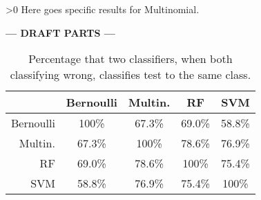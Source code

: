 \ifnum\printdraft>0
	Here goes specific results for Multinomial.
\else
\begin{center}
  	\textbf{--- DRAFT PARTS ---}
\end{center}
\fi

\begin{table}[h]\footnotesize
	\caption{Percentage that two classifiers, when both classifying wrong, classifies test to the same class.}
	\begin{tabular}{r|cccc}
	\ 		 	& Bernoulli & Multin. 	&RF 		&SVM \\ \hline
	Bernoulli 	&100\%   	&67.3\%   	&69.0\%   	&58.8\%\\
	Multin. 	&67.3\%  	&100\%   	&78.6\%   	&76.9\%\\
	RF 			&69.0\%   	&78.6\%  	&100\%   	&75.4\%\\
	SVM 		&58.8\%   	&76.9\%   	&75.4\%  	&100\%
	\end{tabular}
	\label{tab:similarity}
\end{table}
